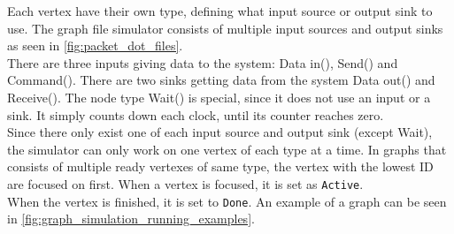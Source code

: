 Each vertex have their own type, defining what input source or output sink to
use. The graph file simulator consists of multiple input sources and output sinks
as seen in \autoref{fig:packet_dot_files}.\\
There are three inputs giving data to the system:
Data in(),
Send() and
Command().
There are two sinks getting data from the system
Data out() and
Receive().
The node type Wait() is special, since
it does not use an input or a sink. It simply counts down each clock, until its
counter reaches zero.\\
Since there only exist one of each input source and output sink (except Wait),
the simulator can only work on one vertex of each type at a time.
In graphs that consists of multiple ready vertexes of same type, the vertex with
the lowest ID are focused on first. When a vertex is focused, it is set as
\texttt{Active}.\\
When the vertex is finished, it is set to \texttt{Done}.
An example of a graph can be seen in
\autoref{fig:graph_simulation_running_examples}.


